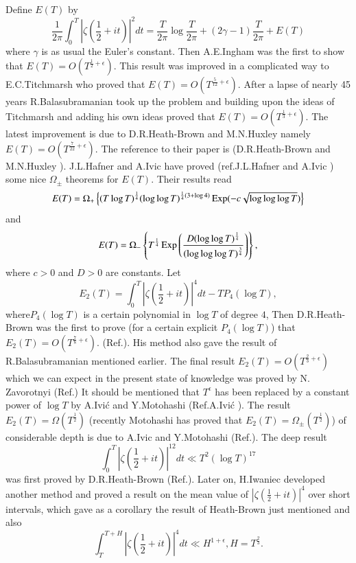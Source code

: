 Define $E(T)$ by
$$
\frac{1}{2\pi}\int^{T}_{0}|\zeta \left(\frac{1}{2}+it \right)|^{2}dt=\frac{T}{2\pi}\log
\frac{T}{2\pi}+(2\gamma-1)\frac{T}{2\pi}+E(T)
$$
where $\gamma$ is as usual the Euler's constant. Then A.E.\@ Ingham
was the first to show that $E(T)=O(T^{\frac{1}{2}+\epsilon})$. This
result was improved in a complicated way to E.C.\@ Titchmarsh who
proved that $E(T)=O(T^{\frac{5}{12}+\epsilon})$. After a lapse of
nearly 45 years R.\@ Balasubramanian \cite{Balasubramanian2} took up the problem
and building upon the ideas of Titchmarsh and adding his own ideas
proved that $E(T)=O(T^{\frac{1}{3}+\epsilon})$. The latest improvement
is due to D.R.\@ Heath-Brown and M.N.\@ Huxley namely
$E(T)=O(T^{\frac{7}{22}+\epsilon})$. The reference to their paper is
(D.R.\@ Heath-Brown and M.N.\@ Huxley \cite{Heath-Brown and Huxley1}). J.L.\@ Hafner and
A.\@ Ivic have proved (ref.\@ J.L.\@ Hafner and A.\@ Ivic \cite{Hafner and Ivic1})
some nice $\Omega_{\pm}$ theorems for $E(T)$. Their results read
$$
E(T)=\Omega_{+}\left\{(T\log T)^{\frac{1}{4}}(\log\log
T)^{\frac{1}{4}(3+\log 4)}\operatorname{Exp}(-c\sqrt{\log\log\log T})\right\}
$$
and
$$
E(T)=\Omega_{-}\left\{T^{\frac{1}{4}}\operatorname{Exp} \left(\frac{D(\log\log
  T)^{\frac{1}{4}}}{(\log\log\log T)^{\frac{3}{4}}}\right)\right\},
$$
where $c>0$ and $D>0$ are constants. Let
$$
E_{2}(T)=\int^{T}_{0}|\zeta \left(\frac{1}{2}+it \right)|^{4}dt-TP_{4}(\log T),
$$
where\pageoriginale $P_{4}(\log T)$ is a certain polynomial in $\log
T$ of degree $4$, Then D.R.\@ Heath-Brown was the first to prove (for
a certain explicit $P_{4}(\log T)$) that
$E_{2}(T)=O(T^{\frac{7}{8}+\epsilon})$. (Ref.\@ \cite{Heath-Brown3}). His
method also gave the result of R.\@ Balasubramanian mentioned
earlier. The final result $E_{2}(T)= O(T^{\frac{2}{3}+\epsilon})$ which
we can expect in the present state of knowledge was proved by N.\@
Zavorotnyi (Ref.\@ \cite{Zavorotnyi1}) It should be mentioned that
$T^{\epsilon}$ has been replaced by a constant power of $\log T$ by
A.\@ Ivi\'c and Y.\@ Motohashi (Ref.\@ A.\@ Ivi\'c \cite{Ivic2}). The
result $E_{2}(T)=\Omega(T^{\frac{1}{2}})$ (recently Motohashi has
proved that $E_{2}(T)=\Omega_{\pm}(T^{\frac{1}{2}})$) of considerable
depth is due to A.\@ Ivic and Y.\@ Motohashi (Ref.\@ \cite{Ivic and  Motohashi1}). The
deep result 
$$
\int^{T}_{0}|\zeta \left(\frac{1}{2}+it \right)|^{12}dt\ll T^{2}(\log T)^{17}
$$
was first proved by D.R.\@ Heath-Brown (Ref.\@ \cite{Heath-Brown2}). Later on,
H.\@ Iwaniec developed another method and proved a result on the mean
value of $|\zeta \left(\frac{1}{2}+it \right)|^{4}$ over short intervals, which
gave as a corollary the result of Heath-Brown just mentioned and also
$$
 \int^{T+H}_{T}|\zeta \left(\frac{1}{2}+it \right)|^{4}dt\ll
H^{1+\epsilon},H=T^{\frac{2}{3}}. 
$$

